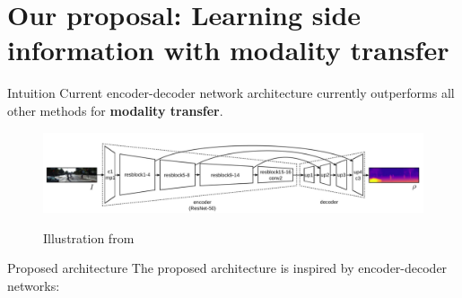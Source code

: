 \section{Our proposal: Learning side information with modality transfer}

\label{subsec:modality}

\begin{frame}{Intuition}
	\vfill
	Current encoder-decoder network architecture currently outperforms all other methods for \textbf{modality transfer}.
	\vfill
	\begin{figure}
		\centering
		\includegraphics[width=\linewidth]{images/depth_inference/kusnietzov.png}
		
		Illustration from~\cite{Kuznietsov2017}
	\end{figure}
	\vfill
\end{frame}


\begin{frame}{Proposed architecture}
	\vfill
	The proposed architecture is inspired by encoder-decoder networks:
	\vfill
	\begin{figure}
		\centering
		\end{figure}
	\vfill
\end{frame}


